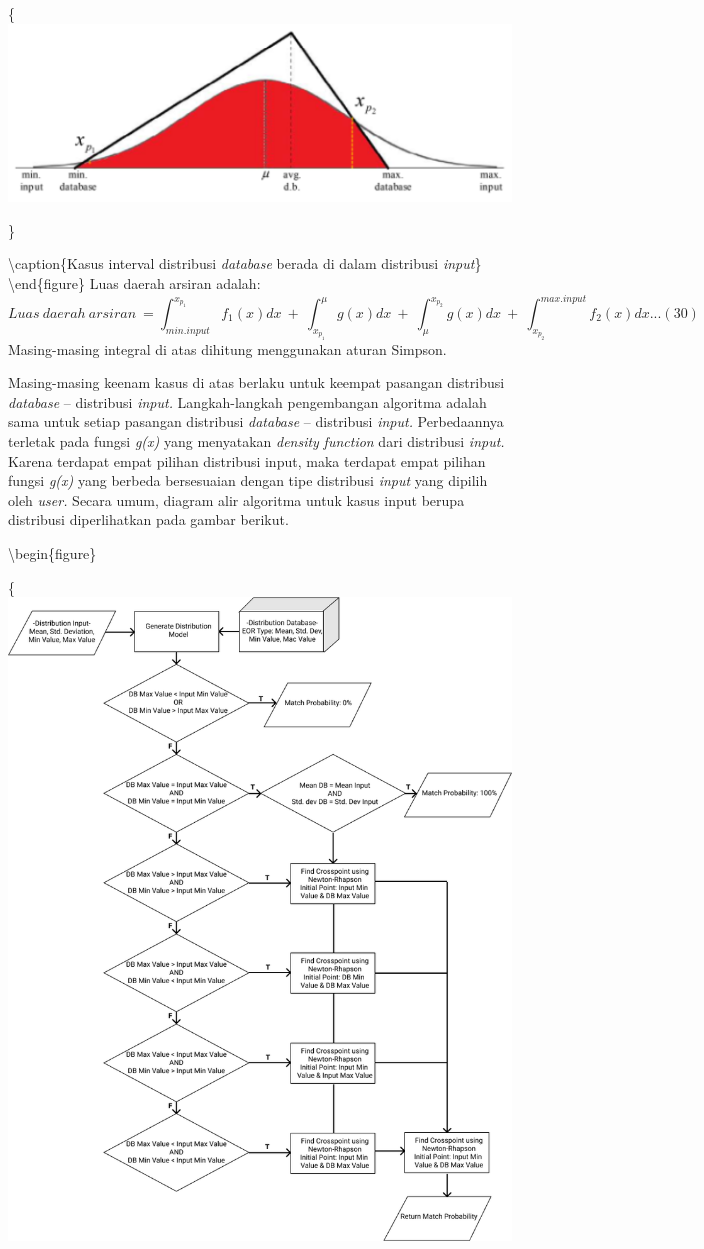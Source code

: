 \documentclass[
]{book}
\begin{document}
\{\centering \includegraphics[width=0.5\linewidth]{images/screening/interval_dalam1}

\}

\textbackslash caption\{Kasus interval distribusi \emph{database} berada di dalam distribusi \emph{input}\}\label{fig:unnamed-chunk-38}
\textbackslash end\{figure\}
Luas daerah arsiran adalah: \[Luas\ daerah\ arsiran\ = \int_{min.input}^{x_{p_1}}f_1(x)dx\ +\ \int_{x_{p_1}}^{\mu}g(x)dx\ +\ \int_{\mu}^{x_{p_2}}g(x)dx\ +\ \int_{x_{p_2}}^{max.input}f_2(x)dx...(30)\]
Masing-masing integral di atas dihitung menggunakan aturan Simpson.

Masing-masing keenam kasus di atas berlaku untuk keempat pasangan distribusi \emph{database} -- distribusi \emph{input.} Langkah-langkah pengembangan algoritma adalah sama untuk setiap pasangan distribusi \emph{database} -- distribusi \emph{input.} Perbedaannya terletak pada fungsi \emph{g(x)} yang menyatakan \emph{density} \emph{function} dari distribusi \emph{input.} Karena terdapat empat pilihan distribusi input, maka terdapat empat pilihan fungsi \emph{g(x)} yang berbeda bersesuaian dengan tipe distribusi \emph{input} yang dipilih oleh \emph{user.} Secara umum, diagram alir algoritma untuk kasus input berupa distribusi diperlihatkan pada gambar berikut.

\textbackslash begin\{figure\}

\{\centering \includegraphics[width=0.75\linewidth]{images/screening/flowchart}
\end{document}
